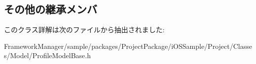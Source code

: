 \subsection*{その他の継承メンバ}


このクラス詳解は次のファイルから抽出されました\+:\begin{DoxyCompactItemize}
\item 
Framework\+Manager/sample/packages/\+Project\+Package/i\+O\+S\+Sample/\+Project/\+Classes/\+Model/Profile\+Model\+Base.\+h\end{DoxyCompactItemize}
